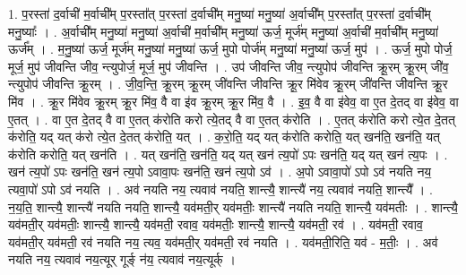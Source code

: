 \documentclass[17pt]{extarticle}
\begin{document}
1. प॒रस्ता॑ द॒र्वाची॑ म॒र्वाची᳚म् प॒रस्ता᳚त् प॒रस्ता॑ द॒र्वाची᳚म् मनु॒ष्या॑ मनु॒ष्या॑ अ॒र्वाची᳚म् प॒रस्ता᳚त् प॒रस्ता॑ द॒र्वाची᳚म् मनु॒ष्याः᳚ । . अ॒र्वाची᳚म् मनु॒ष्या॑ मनु॒ष्या॑ अ॒र्वाची॑ म॒र्वाची᳚म् मनु॒ष्या॑ ऊर्ज॒ मूर्ज॑म् मनु॒ष्या॑ अ॒र्वाची॑ म॒र्वाची᳚म् मनु॒ष्या॑ ऊर्ज᳚म् । . म॒नु॒ष्या॑ ऊर्ज॒ मूर्ज॑म् मनु॒ष्या॑ मनु॒ष्या॑ ऊर्ज॒ मुपो पोर्ज॑म् मनु॒ष्या॑ मनु॒ष्या॑ ऊर्ज॒ मुप॑ । . ऊर्ज॒ मुपो पोर्ज॒ मूर्ज॒ मुप॑ जीवन्ति जीव॒ न्त्युपोर्ज॒ मूर्ज॒ मुप॑ जीवन्ति । . उप॑ जीवन्ति जीव॒ न्त्युपोप॑ जीवन्ति क्रू॒रम् क्रू॒रम् जी॑व॒ न्त्युपोप॑ जीवन्ति क्रू॒रम् । . जी॒व॒न्ति॒ क्रू॒रम् क्रू॒रम् जी॑वन्ति जीवन्ति क्रू॒र मि॑वेव क्रू॒रम् जी॑वन्ति जीवन्ति क्रू॒र मि॑व । . क्रू॒र मि॑वेव क्रू॒रम् क्रू॒र मि॑व॒ वै वा इ॑व क्रू॒रम् क्रू॒र मि॑व॒ वै । . इ॒व॒ वै वा इ॑वेव॒ वा ए॒त दे॒तद् वा इ॑वेव॒ वा ए॒तत् । . वा ए॒त दे॒तद् वै वा ए॒तत् क॑रोति करो त्ये॒तद् वै वा ए॒तत् क॑रोति । . ए॒तत् क॑रोति करो त्ये॒त दे॒तत् क॑रोति॒ यद् यत् क॑रो त्ये॒त दे॒तत् क॑रोति॒ यत् । . क॒रो॒ति॒ यद् यत् क॑रोति करोति॒ यत् खन॑ति॒ खन॑ति॒ यत् क॑रोति करोति॒ यत् खन॑ति । . यत् खन॑ति॒ खन॑ति॒ यद् यत् खन॑ त्य॒पो॑ ऽपः खन॑ति॒ यद् यत् खन॑ त्य॒पः । . खन॑ त्य॒पो॑ ऽपः खन॑ति॒ खन॑ त्य॒पो ऽवावा॒पः खन॑ति॒ खन॑ त्य॒पो ऽव॑ । . अ॒पो ऽवावा॒पो॑ ऽपो ऽव॑ नयति नय॒ त्यवा॒पो॑ ऽपो ऽव॑ नयति । . अव॑ नयति नय॒ त्यवाव॑ नयति॒ शान्त्यै॒ शान्त्यै॑ नय॒ त्यवाव॑ नयति॒ शान्त्यै᳚ । . न॒य॒ति॒ शान्त्यै॒ शान्त्यै॑ नयति नयति॒ शान्त्यै॒ यव॑मती॒र् यव॑मतीः॒ शान्त्यै॑ नयति नयति॒ शान्त्यै॒ यव॑मतीः । . शान्त्यै॒ यव॑मती॒र् यव॑मतीः॒ शान्त्यै॒ शान्त्यै॒ यव॑मती॒ रवाव॒ यव॑मतीः॒ शान्त्यै॒ शान्त्यै॒ यव॑मती॒ रव॑ । . यव॑मती॒ रवाव॒ यव॑मती॒र् यव॑मती॒ रव॑ नयति नय॒ त्यव॒ यव॑मती॒र् यव॑मती॒ रव॑ नयति । . यव॑मती॒रिति॒ यव॑ - म॒तीः॒ । . अव॑ नयति नय॒ त्यवाव॑ नय॒त्यूर् गूर्ङ् न॑य॒ त्यवाव॑ नय॒त्यूर्क् । \newline
\end{document}
